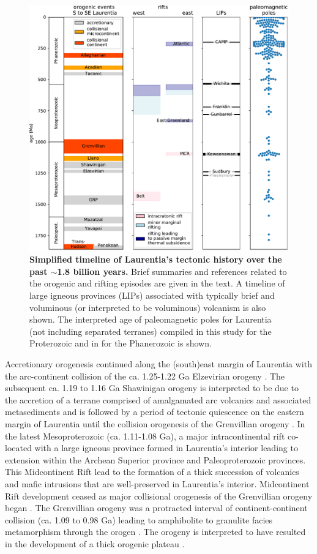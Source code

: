 \documentclass[11pt,letterpaper]{article}
\begin{document}
\begin{figure}
\centering
\includegraphics[width=\textwidth]{../Figures/Tectonic_history.pdf}
\caption{\small{\textbf{Simplified timeline of Laurentia's tectonic history over the past $\sim$1.8 billion years.} Brief summaries and references related to the orogenic and rifting episodes are given in the text. A timeline of large igneous provinces  (LIPs) associated with typically brief and voluminous (or interpreted to be voluminous) volcanism is also shown. The interpreted age of paleomagnetic poles for Laurentia (not including separated terranes) compiled in this study for the Proterozoic and in \cite{Torsvik2012a} for the Phanerozoic is shown.}}
\label{fig:tectonic_history}
\end{figure}

Accretionary orogenesis continued along the (south)east margin of Laurentia with the arc-continent collision of the ca. 1.25-1.22 Ga Elzevirian orogeny \citep{McLelland2013a}. The subsequent ca. 1.19 to 1.16 Ga Shawinigan orogeny is interpreted to be due to the accretion of a terrane comprised of amalgamated arc volcanics and associated metasediments and is followed by a period of tectonic quiescence on the eastern margin of Laurentia until the collision orogenesis of the Grenvillian orogeny \citep{McLelland2010a}. In the latest Mesoproterozoic (ca. 1.11-1.08 Ga), a major intracontinental rift co-located with a large igneous province formed in Laurentia's interior leading to extension within the Archean Superior province and Paleoproterozoic provinces. This Midcontinent Rift lead to the formation of a thick succession of volcanics and mafic intrusions that are well-preserved in Laurentia's interior.  Midcontinent Rift development ceased as major collisional orogenesis of the Grenvillian orogeny began \citep{Swanson-Hysell2019a}. The Grenvillian orogeny was a protracted interval of continent-continent collision (ca. 1.09 to 0.98 Ga) leading to amphibolite to granulite facies metamorphism through the orogen \citep{McLelland2010a}. The orogeny is interpreted to have resulted in the development of a thick orogenic plateau \citep{Rivers2008a}.
\end{document}
